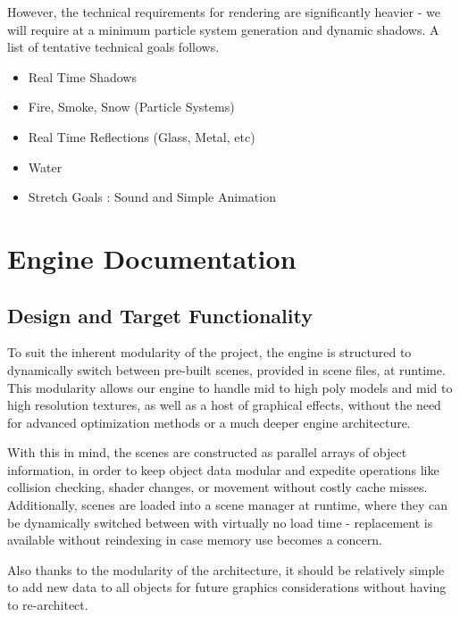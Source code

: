 \documentclass[11pt]{article} %
\begin{document}
However, the technical requirements for rendering are significantly heavier - we will require at a minimum particle system generation and dynamic shadows. A list of tentative technical goals follows.

\begin{itemize}
\item Real Time Shadows
\item Fire, Smoke, Snow (Particle Systems)
\item Real Time Reflections (Glass, Metal, etc)
\item Water
\item Stretch Goals : Sound and Simple Animation
\end{itemize} 

\newpage
\section{Engine Documentation}

\subsection{Design and Target Functionality}
To suit the inherent modularity of the project, the engine is structured to dynamically
switch between pre-built scenes, provided in scene files, at runtime. This modularity allows
our engine to handle mid to high poly models and mid to high resolution textures, as well as a host of graphical effects, without the need for advanced optimization methods or a much deeper engine architecture. 
\par With this in mind, the scenes are constructed as parallel arrays of object information, in order to keep object data modular and expedite operations like collision checking, shader changes, or movement without costly cache misses. Additionally, scenes are loaded into a scene manager at runtime, where they can be dynamically switched between with virtually no load time - replacement is available without reindexing in case memory use becomes a concern.
\par Also thanks to the modularity of the architecture, it should be relatively simple to add new data to all objects for future graphics considerations without having to re-architect.
\end{document}
